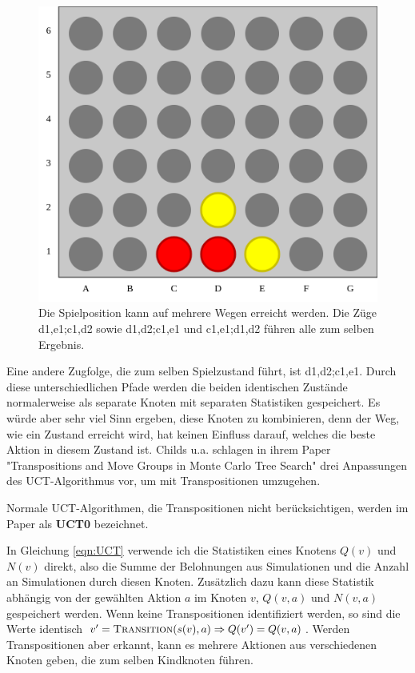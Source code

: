 \begin{figure}[hbt!]
	\centering
	\includegraphics[width=0.7\linewidth]{c4_transpos}
	\caption[Transposition in Vier Gewinnt]{Die Spielposition kann auf mehrere Wegen erreicht werden. Die Züge d1,e1;c1,d2 sowie d1,d2;c1,e1 und c1,e1;d1,d2 führen alle zum selben Ergebnis.}
	\label{fig:c4transpos}
\end{figure}

Eine andere Zugfolge, die zum selben Spielzustand führt, ist d1,d2;c1,e1. Durch diese unterschiedlichen Pfade werden die beiden identischen Zustände normalerweise als separate Knoten mit separaten Statistiken gespeichert. Es würde aber sehr viel Sinn ergeben, diese Knoten zu kombinieren, denn der Weg, wie ein Zustand erreicht wird, hat keinen Einfluss darauf, welches die beste Aktion in diesem Zustand ist. Childs u.a. schlagen in ihrem Paper "Transpositions and Move Groups in Monte Carlo Tree Search"\autocite[\ppno~390\psq]{childsTranspositionsMoveGroups2008} drei Anpassungen des UCT-Algorithmus vor, um mit Transpositionen umzugehen. 

Normale UCT-Algorithmen, die Transpositionen nicht berücksichtigen, werden im Paper als \textbf{UCT0} bezeichnet. 

In Gleichung \ref{eqn:UCT} verwende ich die Statistiken eines Knotens $Q(v)$ und $N(v)$ direkt, also die Summe der Belohnungen aus Simulationen und die Anzahl an Simulationen durch diesen Knoten. Zusätzlich dazu kann diese Statistik abhängig von der gewählten Aktion $a$ im Knoten $v$, $Q(v,a)$ und $N(v,a)$ gespeichert werden. Wenn keine Transpositionen identifiziert werden, so sind die Werte identisch $v^\prime = \textsc{Transition}(s(v),a) \Rightarrow Q(v') = Q(v,a)$. Werden Transpositionen aber erkannt, kann es mehrere Aktionen aus verschiedenen Knoten geben, die zum selben Kindknoten führen. 

